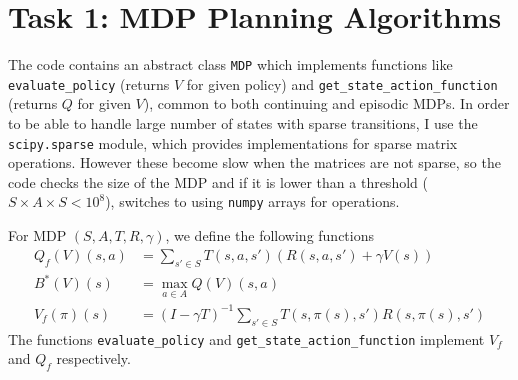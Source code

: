 \section*{Task 1: MDP Planning Algorithms}

The code contains an abstract class \lstinline{MDP} which implements functions like \lstinline{evaluate_policy} (returns $V$ for given policy) and \lstinline{get_state_action_function} (returns $Q$ for given $V$), common to both continuing and episodic MDPs. In order to be able to handle large number of states with sparse transitions, I use the \lstinline{scipy.sparse} module, which provides implementations for sparse matrix operations. However these become slow when the matrices are not sparse, so the code checks the size of the MDP and if it is lower than a threshold ($S\times A\times S < 10^8$), switches to using \lstinline{numpy} arrays for operations.

For MDP $(S, A, T, R, \gamma)$, we define the following functions
\begin{align*}
    Q_f(V)(s, a) &= \sum\limits_{s'\in S}T(s, a, s')\left(R(s, a, s') + \gamma V(s)\right) \\
    B^*(V)(s) &= \max\limits_{a\in A} Q(V)(s, a) \\
    V_f(\pi)(s) &= \left(I-\gamma T\right)^{-1}\sum_{s'\in S}T(s, \pi(s), s')R(s, \pi(s), s')
\end{align*}
The functions \lstinline{evaluate_policy} and \lstinline{get_state_action_function} implement $V_f$ and $Q_f$ respectively.
